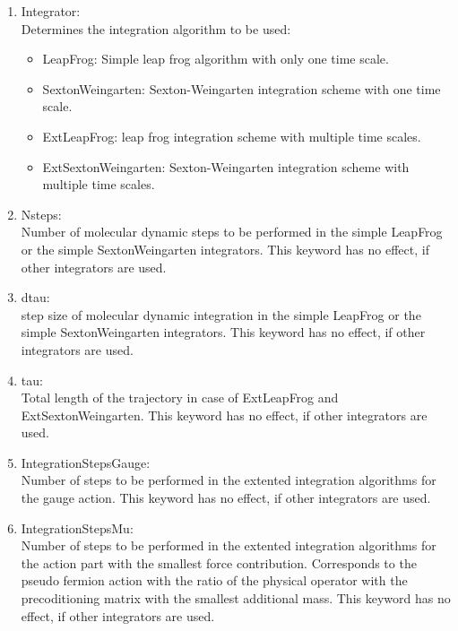 \begin{enumerate}
\item {\ttfamily Integrator}:\\
  Determines the integration algorithm to be used:
  \begin{itemize}
  \item {\ttfamily LeapFrog}: Simple leap frog algorithm with only one
    time scale. 
  \item {\ttfamily SextonWeingarten}: Sexton-Weingarten integration
    scheme with one time scale.
  \item {\ttfamily ExtLeapFrog}: leap frog integration scheme with
    multiple time scales.
  \item {\ttfamily ExtSextonWeingarten}: Sexton-Weingarten integration scheme with
    multiple time scales.
  \end{itemize}

\item {\ttfamily Nsteps}:\\
  Number of molecular dynamic steps to be performed in the simple
  {\ttfamily LeapFrog} or the simple {\ttfamily SextonWeingarten}
  integrators. This keyword has no effect, if other integrators are
  used.

\item {\ttfamily dtau}:\\
  step size of molecular dynamic integration in the simple
  {\ttfamily LeapFrog} or the simple {\ttfamily SextonWeingarten}
  integrators. This keyword has no effect, if other integrators are
  used.

\item {\ttfamily tau}:\\
  Total length of the trajectory in case of {\ttfamily ExtLeapFrog}
  and {\ttfamily ExtSextonWeingarten}. This keyword has no effect, if
  other integrators are used.

\item {\ttfamily IntegrationStepsGauge}:\\
  Number of steps to be performed in the extented integration
  algorithms for the gauge action. This keyword has no effect, if
  other integrators are used.

\item {\ttfamily IntegrationStepsMu}:\\
  Number of steps to be performed in the extented integration
  algorithms for the action part with the smallest force
  contribution. Corresponds to the pseudo fermion action with the
  ratio of the physical operator with the precoditioning matrix with
  the smallest additional mass. This keyword has no effect, if
  other integrators are used.


\end{enumerate}
